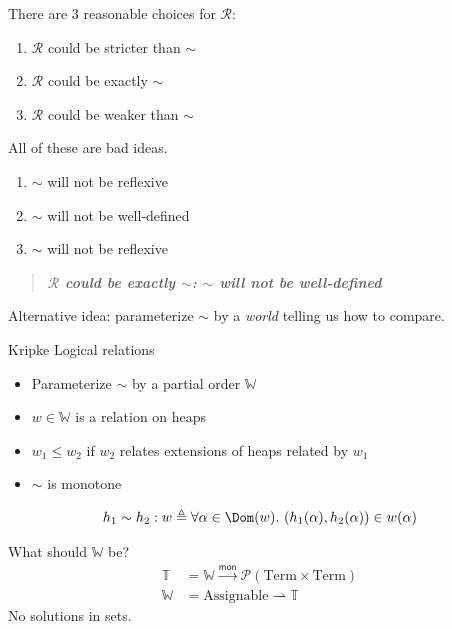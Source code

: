 \documentclass{beamer}
\newcommand{\mto}{\ensuremath{\xrightarrow{\mathsf{mon}}}}
\newcommand{\pto}{\ensuremath{\rightharpoonup}}
\newcommand{\pow}[1]{\ensuremath{\mathcal{P}(#1)}}
\newcommand{\relR}{\ensuremath{\mathrel{\mathcal{R}}}}
\newcommand{\defs}{\ensuremath{\mathrel{\triangleq}}}
\newcommand{\worlds}{\ensuremath{\mathbb{W}}}
\newcommand{\assignables}{\ensuremath{\mathrm{Assignable}}}
\newcommand{\semtypes}{\ensuremath{\mathbb{T}}}
\newcommand{\term}{\ensuremath{\mathrm{Term}}}
\begin{document}
\begin{frame}
  \centering
  There are 3 reasonable choices for $\relR$:
  \begin{enumerate}
  \item $\relR$ could be stricter than $\sim$
  \item $\relR$ could be exactly $\sim$
  \item $\relR$ could be weaker than $\sim$
  \end{enumerate}
  \pause
  \bigskip

  All of these are bad ideas.
  \pause
  \bigskip
  \begin{enumerate}
  \item $\sim$ will not be reflexive
  \item $\sim$ will not be well-defined
  \item $\sim$ will not be reflexive
  \end{enumerate}
\end{frame}

\begin{frame}
  \centering
  \begin{quote}
    \bf\it $\relR$ could be exactly $\sim$: $\sim$ will not be well-defined
  \end{quote}
  Alternative idea: parameterize $\sim$ by a \emph{world} telling us
  how to compare.
\end{frame}

\begin{frame}
  \centering
  Kripke Logical relations
  \begin{itemize}
  \item Parameterize $\sim$ by a partial order $\worlds$
  \item $w \in \worlds$ is a relation on heaps
  \item $w_1 \le w_2$ if $w_2$ relates extensions of heaps related by
    $w_1$
  \item $\sim$ is monotone
  \end{itemize}
  \bigskip
  \[
    h_1 \sim h_2 : w \defs \forall \alpha \in \Dom(w).\ (h_1(\alpha), h_2(\alpha)) \in w(\alpha)
  \]
\end{frame}

\begin{frame}
  \centering What should $\worlds$ be?
  \begin{align*}
    \semtypes &= \worlds \mto \pow{\term \times \term}\\
    \worlds &= \assignables \pto \semtypes
  \end{align*}
  \pause
  \bigskip
  No solutions in sets.
\end{frame}
\end{document}
